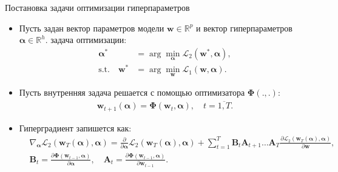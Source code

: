 \documentclass[aspectratio=169]{beamer}
\begin{document}

\begin{frame}{Постановка задачи оптимизации гиперпараметров}
\begin{itemize}
  \item Пусть задан вектор параметров модели $\mathbf{w} \in \mathbb{R}^p$ и вектор гиперпараметров
  $\boldsymbol{\alpha} \in \mathbb{R}^h$. задача оптимизации:
  \begin{align*}
    \boldsymbol{\alpha}^* &= \arg\min_{\boldsymbol{\alpha}}\mathcal{L}_2(\mathbf{w}^*, \boldsymbol{\alpha}), \\
    \mathrm{s.t.} \quad \mathbf{w}^* &= \arg\min_{\mathbf{w}}\mathcal{L}_1(\mathbf{w}, \boldsymbol{\alpha}).
  \end{align*}
  \item Пусть внутренняя задача решается с помощью оптимизатора $\mathbf{\Phi}(., .)$:
  \begin{align*}
    \mathbf{w}_{t + 1}(\boldsymbol{\alpha}) = \mathbf{\Phi}(\mathbf{w}_t, \boldsymbol{\alpha}), \quad
    t = \overline{1, T}.
  \end{align*}
  \item Гиперградиент запишется как:
  \begin{align*}
    &\nabla_{\boldsymbol{\alpha}}\mathcal{L}_2(\mathbf{w}_T(\boldsymbol{\alpha}), \boldsymbol{\alpha}) = 
    \frac{\partial}{\partial \boldsymbol{\alpha}}\mathcal{L}_2(\mathbf{w}_T(\boldsymbol{\alpha}), \boldsymbol{\alpha}) + 
    \sum_{t=1}^T\mathbf{B}_t\mathbf{A}_{t+1}\ldots\mathbf{A}_T
    \frac{\partial \mathcal{L}_2(\mathbf{w}_T(\boldsymbol{\alpha}), \boldsymbol{\alpha})}{\partial\mathbf{w}}, \\
    &\mathbf{B}_t = \frac{\partial\mathbf{\Phi}(\mathbf{w}_{t-1}, \boldsymbol{\alpha})}{\partial\boldsymbol{\alpha}},
    \quad \mathbf{A}_t = \frac{\partial\mathbf{\Phi}(\mathbf{w}_{t-1}, \boldsymbol{\alpha})}{\partial\boldsymbol{w}_{t - 1}}.
  \end{align*}
\end{itemize}
\end{frame}
\end{document}
